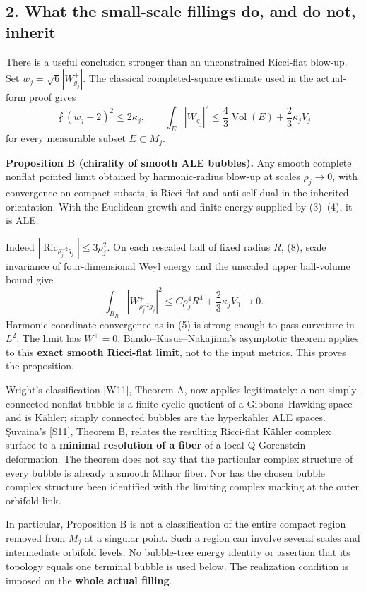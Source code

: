 \documentclass[
  11pt,
]{article}
\begin{document}
\hypertarget{what-the-small-scale-fillings-do-and-do-not-inherit}{%
\subsection{2. What the small-scale fillings do, and do not,
inherit}\label{what-the-small-scale-fillings-do-and-do-not-inherit}}

There is a useful conclusion stronger than an unconstrained Ricci-flat
blow-up. Set \(w_j=\sqrt6|W^+_{g_j}|\). The classical completed-square
estimate used in the actual-form proof gives \[
 \fint(w_j-2)^2\le2\kappa_j,\qquad
 \int_E|W^+_{g_j}|^2\le\frac43\operatorname{Vol}(E)
                          +\frac23\kappa_jV_j         \tag{8}
\] for every measurable subset \(E\subset M_j\).

\textbf{Proposition B (chirality of smooth ALE bubbles).} Any smooth
complete nonflat pointed limit obtained by harmonic-radius blow-up at
scales \(\rho_j\to0\), with convergence on compact subsets, is
Ricci-flat and anti-self-dual in the inherited orientation. With the
Euclidean growth and finite energy supplied by (3)--(4), it is ALE.

Indeed \(|\operatorname{Ric}_{\rho_j^{-2}g_j}|\le3\rho_j^2\). On each
rescaled ball of fixed radius \(R\), (8), scale invariance of
four-dimensional Weyl energy and the unscaled upper ball-volume bound
give \[
 \int_{B_R}|W^+_{\rho_j^{-2}g_j}|^2
       \le C\rho_j^4R^4+\frac23\kappa_jV_0\longrightarrow0.
\] Harmonic-coordinate convergence as in (5) is strong enough to pass
curvature in \(L^2\). The limit has \(W^+=0\). Bando--Kasue--Nakajima's
asymptotic theorem applies to this \textbf{exact smooth Ricci-flat
limit}, not to the input metrics. This proves the proposition.

Wright's classification {[}W11{]}, Theorem A, now applies legitimately:
a non-simply-connected nonflat bubble is a finite cyclic quotient of a
Gibbons--Hawking space and is Kähler; simply connected bubbles are the
hyperkähler ALE spaces. Şuvaina's {[}S11{]}, Theorem B, relates the
resulting Ricci-flat Kähler complex surface to a \textbf{minimal
resolution of a fiber} of a local Q-Gorenstein deformation. The theorem
does not say that the particular complex structure of every bubble is
already a smooth Milnor fiber. Nor has the chosen bubble complex
structure been identified with the limiting complex marking at the outer
orbifold link.

In particular, Proposition B is not a classification of the entire
compact region removed from \(M_j\) at a singular point. Such a region
can involve several scales and intermediate orbifold levels. No
bubble-tree energy identity or assertion that its topology equals one
terminal bubble is used below. The realization condition is imposed on
the \textbf{whole actual filling}.
\end{document}
